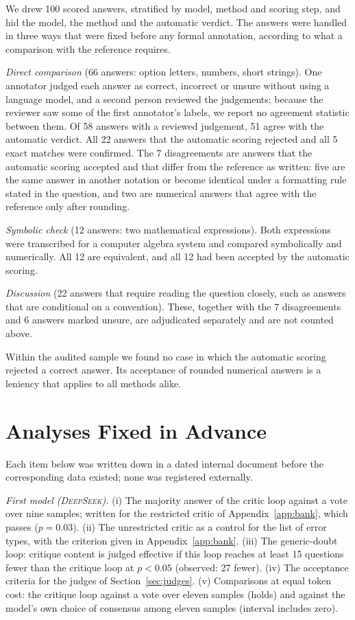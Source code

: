 \documentclass[11pt]{article}
\newcommand{\ds}{\textsc{DeepSeek}}
\begin{document}
We drew 100 scored answers, stratified by model, method and scoring step, and hid the model, the method and the automatic verdict.
The answers were handled in three ways that were fixed before any formal annotation, according to what a comparison with the reference requires.

\emph{Direct comparison} (66 answers: option letters, numbers, short strings).
One annotator judged each answer as correct, incorrect or unsure without using a language model, and a second person reviewed the judgements; because the reviewer saw some of the first annotator's labels, we report no agreement statistic between them.
Of 58 answers with a reviewed judgement, 51 agree with the automatic verdict.
All 22 answers that the automatic scoring rejected and all 5 exact matches were confirmed.
The 7 disagreements are answers that the automatic scoring accepted and that differ from the reference as written: five are the same answer in another notation or become identical under a formatting rule stated in the question, and two are numerical answers that agree with the reference only after rounding.

\emph{Symbolic check} (12 answers: two mathematical expressions).
Both expressions were transcribed for a computer algebra system and compared symbolically and numerically.
All 12 are equivalent, and all 12 had been accepted by the automatic scoring.

\emph{Discussion} (22 answers that require reading the question closely, such as answers that are conditional on a convention).
These, together with the 7 disagreements and 6 answers marked unsure, are adjudicated separately and are not counted above.

Within the audited sample we found no case in which the automatic scoring rejected a correct answer.
Its acceptance of rounded numerical answers is a leniency that applies to all methods alike.

\section{Analyses Fixed in Advance}
\label{app:prereg}

Each item below was written down in a dated internal document before the corresponding data existed; none was registered externally.

\emph{First model (\ds).}
(i) The majority answer of the critic loop against a vote over nine samples; written for the restricted critic of Appendix~\ref{app:bank}, which passes ($p=0.03$).
(ii) The unrestricted critic as a control for the list of error types, with the criterion given in Appendix~\ref{app:bank}.
(iii) The generic-doubt loop: critique content is judged effective if this loop reaches at least 15 questions fewer than the critique loop at $p<0.05$ (observed: 27 fewer).
(iv) The acceptance criteria for the judges of Section~\ref{sec:judges}.
(v) Comparisons at equal token cost: the critique loop against a vote over eleven samples (holds) and against the model's own choice of consensus among eleven samples (interval includes zero).
\end{document}
